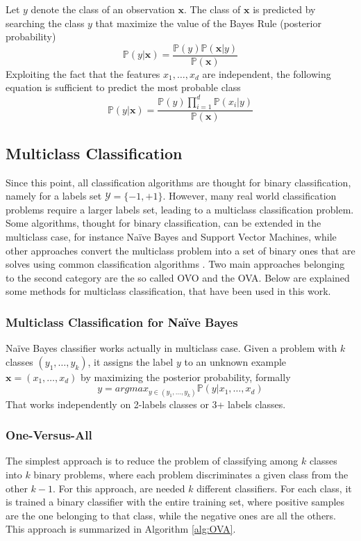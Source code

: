 Let $y$ denote the class of an observation $\mathbf{x}$. The class of $\mathbf{x}$ is predicted by searching the class $y$ that maximize the value of the Bayes Rule (posterior probability)
\[ \mathbb{P}(y | \mathbf{x}) = \frac{\mathbb{P}(y)\mathbb{P}(\mathbf{x} | y)}{\mathbb{P}(\mathbf{x})} \]
Exploiting  the fact that the features $x_1, \dots, x_d$ are independent, the following equation is sufficient to predict the most probable class
\[ \mathbb{P}(y | \mathbf{x}) = \frac{\mathbb{P}(y)\prod_{i=1}^{d}\mathbb{P}(x_i | y) }{\mathbb{P}(\mathbf{x})} \]





\subsection{Multiclass Classification}

Since this point, all classification algorithms are thought for binary classification, namely for a labels set $\mathcal{Y}=\{-1, +1\}$. However, many real world classification problems require a larger labels set, leading to a multiclass classification problem. Some algorithms, thought for binary classification, can be extended in the multiclass case, for instance Na{\"i}ve Bayes and Support Vector Machines, while other approaches convert the multiclass problem into a set of binary ones that are solves using common classification algorithms \cite{Aly05surveyon}. Two main approaches belonging to the second category are the so called \ac{OVO} and the \ac{OVA}. Below are explained some methods for multiclass classification, that have been used in this work.

\subsubsection{Multiclass Classification for Na{\"i}ve Bayes}

Na{\"i}ve Bayes classifier works actually in multiclass case. Given a problem with $k$ classes $(y_1, \dots, y_k)$, it assigns the label $y$ to an unknown example $\mathbf{x} = (x_1, \dots, x_d)$ by maximizing the posterior probability, formally
\[ y = argmax_{y \in (y_1, \dots, y_k)} \mathbb{P}(y | x_1, \dots, x_d)  \]
That works independently on 2-labels classes or 3+ labels classes.

\subsubsection{One-Versus-All}
The simplest approach is to reduce the problem of classifying among $k$ classes into $k$ binary problems, where each problem discriminates a given class from the other $k-1$. For this approach, are needed $k$ different classifiers. For each class, it is trained a binary classifier with the entire training set, where positive samples are the one belonging to that class, while the negative ones are all the others. This approach is summarized in Algorithm \ref{alg:OVA}.

